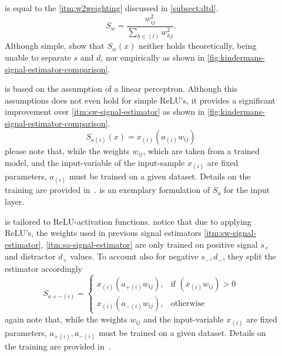 \begin{description}
    \item[] is equal to the \ref{itm:w2weighting} discussed in \cref{subsect:dtd}.
    \begin{equation}
        S_w = \frac{w_{ij}^2}{\sum_{h\in (l)} w_{hj}^2}.
    \end{equation}
    Although simple,  show that \(S_w(x)\) neither holds theoretically, being unable to separate \(s\) and \(d\), nor empirically as shown in \cref{fig:kindermans-signal-estimator-comparison}.
    \item[] is based on the assumption of a linear perceptron. Although this assumptions does not even hold for simple ReLU's, it provides a significant improvement over \ref{itm:sw-signal-estimator} as shown in \cref{fig:kindermans-signal-estimator-comparison}.
    \begin{equation}
        S_{a(i)}(x) = x_{(i)} (a_{(i)} w_{ij})\label{eq:linear-estimator}
    \end{equation}
    please note that, while the weights \(w_{ij}\), which are taken from a trained model, and the input-variable of the input-sample \(x_{(i)}\) are fixed parameters, \(a_{(i)}\) must be trained on a given dataset. Details on the training are provided in~\cite{Kindermans.2018}.  is an exemplary formulation of \(S_a\) for the input layer.
    \item[] is tailored to ReLU-activation functions.  notice that due to applying ReLU's, the weights used in previous signal estimators \ref{itm:sw-signal-estimator}, \ref{itm:sa-signal-estimator} are only trained on positive signal \(s_{+}\) and distractor \(d_{+}\) values. To account also for negative \(s_{-}, d_{-}\), they split the estimator accordingly
    \begin{equation}
        S_{a+-(i)} = 
        \begin{cases}
            x_{(i)} (a_{+(i)} w_{ij}),& {\scriptstyle \text{if } (x_{(i)} w_{ij}) > 0}\\
            x_{(i)} (a_{-(i)} w_{ij}),& {\scriptstyle \text{otherwise}}
        \end{cases}
    \end{equation}
    again note that, while the weights \(w_{ij}\) and the input-variable \(x_{(i)}\) are fixed parameters, \(a_{+(i)}, a_{-(i)}\) must be trained on a given dataset. Details on the training are provided in~\cite{Kindermans.2018}.
\end{description}\label{desc:signal-estimators}
